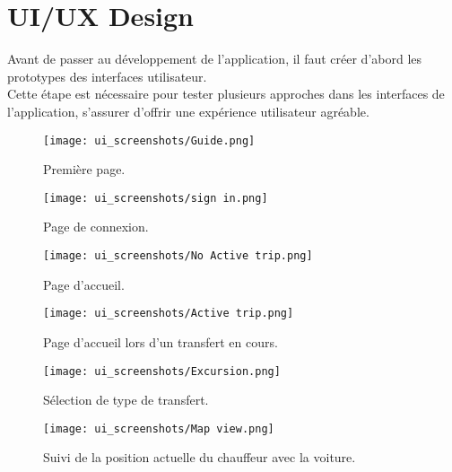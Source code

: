 \section{UI/UX Design}
Avant de passer au développement de l'application, il faut créer d'abord les prototypes des interfaces utilisateur. \\
\noindent Cette étape est nécessaire pour tester plusieurs approches dans les interfaces de l'application, s'assurer d'offrir une expérience utilisateur agréable. \\
\vspace{1cm}
\begin{multicols}{2}
    \begin{figure}[H]
        \centering
        \texttt{[image: ui\_screenshots/Guide.png]}
        \vspace{1cm}
        \caption{Première page.}
        \label{fig:start_page}
    \end{figure}
    \begin{figure}[H]
        \centering
        \texttt{[image: ui\_screenshots/sign in.png]}
        \vspace{1cm}
        \caption{Page de connexion.}
        \label{fig:sign_in_page}
    \end{figure}
\end{multicols}
\clearpage
\begin{multicols}{2}
    \begin{figure}[H]
        \centering
        \texttt{[image: ui\_screenshots/No Active trip.png]}
        \vspace{1cm}
        \caption{\centering Page d'accueil.}
        \label{fig:no_active_trip}
    \end{figure}
    \begin{figure}[H]
        \centering
        \texttt{[image: ui\_screenshots/Active trip.png]}
        \vspace{1cm}
        \caption{\centering Page d'accueil lors d'un transfert en cours.}
        \label{fig:active_trip}
    \end{figure}
\end{multicols}
\begin{multicols}{2}
    \begin{figure}[H]
        \centering
        \texttt{[image: ui\_screenshots/Excursion.png]}
        \vspace{1cm}
        \caption{\centering Sélection de type de transfert.}
        \label{fig:trip_select}
    \end{figure}
    \begin{figure}[H]
        \centering
        \texttt{[image: ui\_screenshots/Map view.png]}
        \vspace{1cm}
        \caption{\centering Suivi de la position actuelle du chauffeur avec la voiture.}
        \label{fig:follow_driver}
    \end{figure}
\end{multicols}
